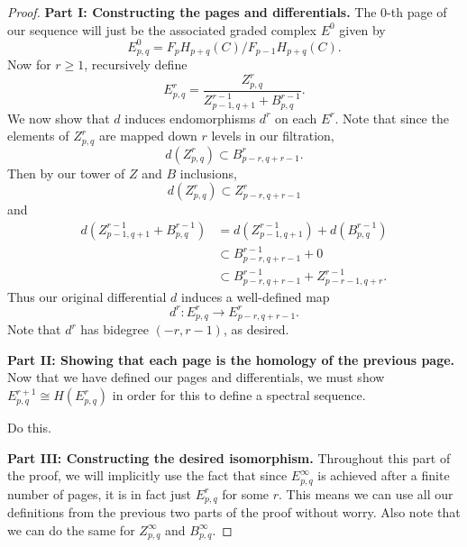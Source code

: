 \documentclass[twoside,10pt]{article}
\begin{document}
\begin{proof}
\textbf{Part I: Constructing the pages and differentials.} The 0-th page of our sequence will just be the associated graded complex $E^{0}$ given by
\[
	E^{0}_{p,q} = F_{p}H_{p+q}(C) / F_{p-1}H_{p+q}(C).
\] 
Now for $r \geq 1$, recursively define
\[
	E^{r}_{p,q} = \frac{Z^{r}_{p,q}}{ Z^{r-1}_{p-1,q+1}+B_{p,q}^{r-1} }.
\] 
We now show that $d$ induces endomorphisms $d^{r}$ on each $E^{r}$. Note that since the elements of $Z^{r}_{p,q}$ are mapped down $r$ levels in our filtration,
\[
	d(Z^{r}_{p,q}) \subset B_{p-r,q+r-1}^{r}.
\] Then by our tower of $Z$ and $B$ inclusions,
\[
	d(Z^{r}_{p,q}) \subset Z_{p-r,q+r-1}^{r}
\] and
\begin{align*}
	d(Z_{p-1,q+1}^{r-1}+B_{p,q}^{r-1}) &= d(Z_{p-1,q+1}^{r-1}) + d(B_{p,q}^{r-1}) \\
				       &\subset B_{p-r,q+r-1}^{r-1} + 0 \\
				       &\subset B^{r-1}_{p-r,q+r-1} + Z_{p-r-1,q+r}^{r-1}.
\end{align*}
Thus our original differential $d$ induces a well-defined map
\[
	d^{r}: E^{r}_{p,q} \to E_{p-r,q+r-1}^{r}.
\] 
Note that $d^{r}$ has bidegree $(-r,r-1)$, as desired.

\textbf{Part II: Showing that each page is the homology of the previous page.} Now that we have defined our pages and differentials, we must show $E_{p,q}^{r+1}\cong  H(E_{p,q}^{r})$ in order for this to define a spectral sequence.

{\color{red}Do this.}

\textbf{Part III: Constructing the desired isomorphism.} Throughout this part of the proof, we will implicitly use the fact that since $E_{p,q}^{\infty}$ is achieved after a finite number of pages, it is in fact just $E_{p,q}^{r}$ for some $r$. This means we can use all our definitions from the previous two parts of the proof without worry. Also note that we can do the same for $Z_{p,q}^{\infty}$ and $B_{p,q}^{\infty}$.


\end{proof}
\end{document}
